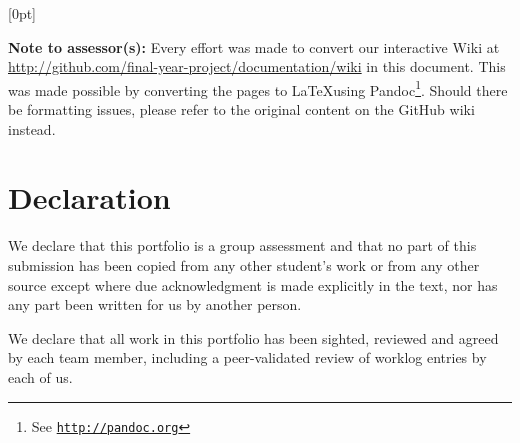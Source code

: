 %
%
\def \unitcode      {SWE40001}
\def \unitname      {Software Engineering Project A}


\usepackage{titletoc}
\linespread{1.5}

  [0pt]%
  {}%
  {\chaptername\ \thecontentslabel\quad}%
  {}%
  {\rmfamily \hfill\contentspage\\}%



\titlepagehere
\cleartoleftpage
\textbf{Note to assessor(s):} Every effort was made to convert our interactive Wiki
at \url{http://github.com/final-year-project/documentation/wiki} in this document.
This was made possible by converting the pages to \LaTeX using Pandoc\footnote{See \texttt{\url{http://pandoc.org}}}. Should there
be formatting issues, please refer to the original content on the GitHub wiki instead.

\cleartoleftpage

\section*{Declaration}

We declare that this portfolio is a group assessment and that no part of this
submission has been copied from any other student's work or from any other
source except where due acknowledgment is made explicitly in the text, nor has
any part been written for us by another person.

We declare that all work in this portfolio has been sighted, reviewed and agreed
by each team member, including a peer-validated review of worklog entries by
each of us.


\vspace{5em}

